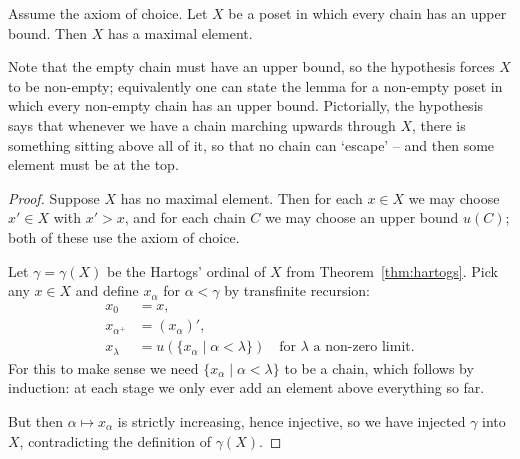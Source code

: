 \begin{theorem}\label{thm:zorn}
Assume the axiom of choice. Let $X$ be a poset in which every chain has an upper bound. Then $X$ has a maximal element.
\end{theorem}

Note that the empty chain must have an upper bound, so the hypothesis forces $X$ to be non-empty; equivalently one can state the lemma for a non-empty poset in which every non-empty chain has an upper bound. Pictorially, the hypothesis says that whenever we have a chain marching upwards through $X$, there is something sitting above all of it, so that no chain can `escape' -- and then some element must be at the top.

\begin{center}
\end{center}

\begin{proof}
  Suppose $X$ has no maximal element. Then for each $x \in X$ we may choose $x' \in X$ with $x' > x$, and for each chain $C$ we may choose an upper bound $u(C)$; both of these use the axiom of choice.

  Let $\gamma = \gamma(X)$ be the Hartogs' ordinal of $X$ from Theorem~\ref{thm:hartogs}. Pick any $x \in X$ and define $x_\alpha$ for $\alpha < \gamma$ by transfinite recursion:
  \begin{align*}
    x_0 &= x, \\
    x_{\alpha^+} &= (x_{\alpha})', \\
    x_{\lambda} &= u(\{x_\alpha \mid \alpha < \lambda\}) \quad \text{for } \lambda \text{ a non-zero limit.}
  \end{align*}
  For this to make sense we need $\{x_\alpha \mid \alpha < \lambda\}$ to be a chain, which follows by induction: at each stage we only ever add an element above everything so far.

  But then $\alpha \mapsto x_\alpha$ is strictly increasing, hence injective, so we have injected $\gamma$ into $X$, contradicting the definition of $\gamma(X)$.
\end{proof}

